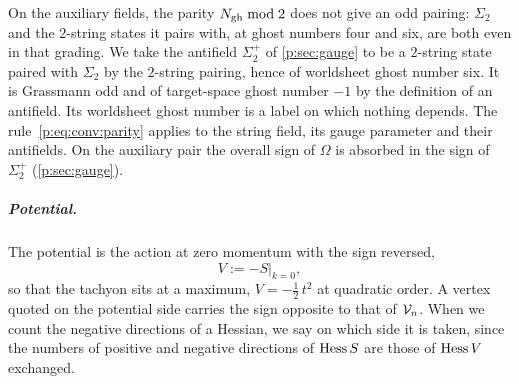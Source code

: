 On the auxiliary fields, the parity $N_{\text{gh}} \bmod 2$ does not give an odd pairing: $\Sigma_2$ and the $2$-string states it pairs with, at ghost numbers four and six, are both even in that grading.
We take the antifield $\Sigma_2^+$ of \cref{p:sec:gauge} to be a $2$-string state paired with $\Sigma_2$ by the $2$-string pairing, hence of worldsheet ghost number six.
It is Grassmann odd and of target-space ghost number $-1$ by the definition of an antifield.
Its worldsheet ghost number is a label on which nothing depends.
The rule~\eqref{p:eq:conv:parity} applies to the string field, its gauge parameter and their antifields.
On the auxiliary pair the overall sign of $\Omega$ is absorbed in the sign of $\Sigma_2^+$ (\cref{p:sec:gauge}).


\subparagraph{Potential.}


The potential is the action at zero momentum with the sign reversed,
\begin{equation}
  \label{p:eq:conv:potential}
  V
    := - S \big\vert_{k = 0},
\end{equation}
so that the tachyon sits at a maximum, $V = -\tfrac{1}{2} \, t^2$ at quadratic order.
A vertex quoted on the potential side carries the sign opposite to that of $\mathcal{V}_{n}$.
When we count the negative directions of a Hessian, we say on which side it is taken, since the numbers of positive and negative directions of $\operatorname{Hess} S$ are those of $\operatorname{Hess} V$ exchanged.
